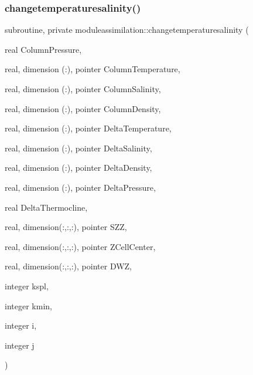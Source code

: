 \subsubsection{\texorpdfstring{changetemperaturesalinity()}{changetemperaturesalinity()}}
{\footnotesize\ttfamily subroutine, private moduleassimilation\+::changetemperaturesalinity (\begin{DoxyParamCaption}\item[{real}]{Column\+Pressure,  }\item[{real, dimension (\+:), pointer}]{Column\+Temperature,  }\item[{real, dimension (\+:), pointer}]{Column\+Salinity,  }\item[{real, dimension (\+:), pointer}]{Column\+Density,  }\item[{real, dimension (\+:), pointer}]{Delta\+Temperature,  }\item[{real, dimension (\+:), pointer}]{Delta\+Salinity,  }\item[{real, dimension (\+:), pointer}]{Delta\+Density,  }\item[{real, dimension (\+:), pointer}]{Delta\+Pressure,  }\item[{real}]{Delta\+Thermocline,  }\item[{real, dimension(\+:,\+:,\+:), pointer}]{S\+ZZ,  }\item[{real, dimension(\+:,\+:,\+:), pointer}]{Z\+Cell\+Center,  }\item[{real, dimension(\+:,\+:,\+:), pointer}]{D\+WZ,  }\item[{integer}]{kspl,  }\item[{integer}]{kmin,  }\item[{integer}]{i,  }\item[{integer}]{j }\end{DoxyParamCaption})\hspace{0.3cm}{\ttfamily [private]}}

